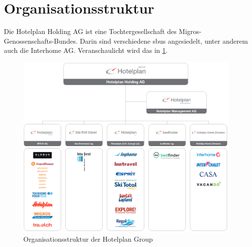 \section{Organisationsstruktur}
\label{sec:einleitung:ausgangslage:organisationsstruktur}
Die Hotelplan Holding AG ist eine Tochtergesellschaft des Migros-Genossenschafts-Bundes. Darin sind verschiedene \glspl{sbu} angesiedelt, unter anderem auch die Interhome AG. Veranschaulicht wird das in \cref{fig:einleitung:organisationsstruktur:1}.
\label{sec:einleitung:organisationsstruktur}
\begin{figure}[h]
	\RawFloats
	\centering
	\includegraphics[width=1\textwidth]{images/organisationsstruktur}
	\caption{Organisationsstruktur der Hotelplan Group}
	\label{fig:einleitung:organisationsstruktur:1}
\end{figure}

